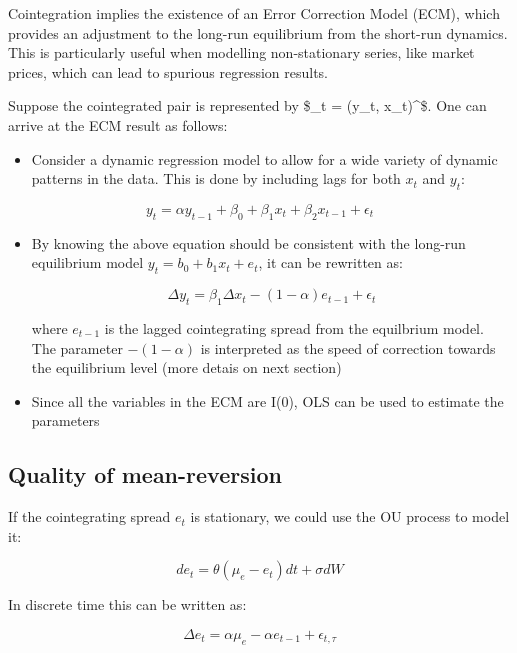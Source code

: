 \documentclass{article}
\providecommand{\tightlist}{%
      \setlength{\itemsep}{0pt}\setlength{\parskip}{0pt}}
\begin{document}
Cointegration implies the existence of an Error Correction Model (ECM),
which provides an adjustment to the long-run equilibrium from the
short-run dynamics. This is particularly useful when modelling
non-stationary series, like market prices, which can lead to spurious
regression results.

Suppose the cointegrated pair is represented by \$\_t = (y\_t,
x\_t)\^{}\prime \$. One can arrive at the ECM result as follows:

\begin{itemize}
\tightlist
\item
  Consider a dynamic regression model to allow for a wide variety of
  dynamic patterns in the data. This is done by including lags for both
  \(x_t\) and \(y_t\):
\end{itemize}

\[
y_t = \alpha y_{t-1} +  \beta_0 + \beta_1 x_t + \beta_2 x_{t-1} + \epsilon_t
\]

\begin{itemize}
\item
  By knowing the above equation should be consistent with the long-run
  equilibrium model \(y_t = b_0 + b_1 x_t + e_t\), it can be rewritten
  as:

  \[
  \Delta y_{t} = \beta_1 \Delta x_t - (1- \alpha) e_{t-1} + \epsilon_t
  \]

  where \(e_{t-1}\) is the lagged cointegrating spread from the
  equilbrium model. The parameter \(-(1-\alpha)\) is interpreted as the
  speed of correction towards the equilibrium level (more detais on next
  section)
\item
  Since all the variables in the ECM are I(0), OLS can be used to
  estimate the parameters
\end{itemize}

    \subsection{Quality of mean-reversion}\label{quality-of-mean-reversion}

If the cointegrating spread \(e_t\) is stationary, we could use the OU
process to model it:

\[
d e_t = \theta (\mu_e - e_t) dt + \sigma dW
\]

In discrete time this can be written as:

\[ 
\begin{equation}
\Delta e_t = \alpha \mu_e - \alpha e_{t-1} + \epsilon_{t, \tau}
\end{equation}
\]
\end{document}
